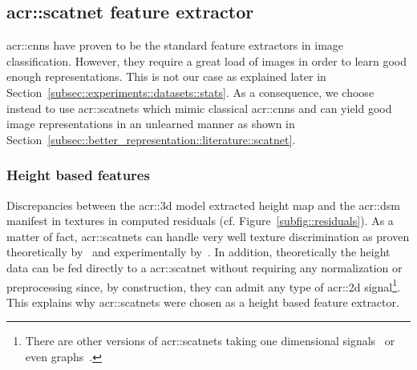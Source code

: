     \subsection{\texorpdfstring{\acrshort*{acr::scatnet}}{ScatNet} feature extractor}
        \label{subsec::better_representation::evaluation::image}
        \glspl{acr::cnn} have proven to be the standard feature extractors in image classification.
        However, they require a great load of images in order to learn good enough representations.
        This is not our case as explained later in Section~\ref{subsec::experiments::datasets::stats}.
        As a consequence, we choose instead to use \glspl{acr::scatnet} which mimic classical \glspl{acr::cnn} and can yield good image representations in an unlearned manner as shown in Section~\ref{subsec::better_representation::literature::scatnet}.

        \subsubsection{Height based features}
            Discrepancies between the \gls{acr::3d} model extracted height map and the \gls{acr::dsm} manifest in textures in computed residuals (cf. Figure~\ref{subfig::residuals}).
            As a matter of fact, \glspl{acr::scatnet} can handle very well texture discrimination as proven theoretically by~\textcite{mallat2012group} and experimentally by~\textcite{bruna2013invariant,sifre2013rotation}.
            In addition, theoretically the height data can be fed directly to a \gls{acr::scatnet} without requiring any normalization or preprocessing since, by construction, they can admit any type of \gls{acr::2d} signal\footnote{There are other versions of \glspl{acr::scatnet} taking one dimensional signals~\parencite{anden2014deep} or even graphs~\parencite{eickenberg2018solid}.}.
            This explains why \glspl{acr::scatnet} were chosen as a height based feature extractor.\\

